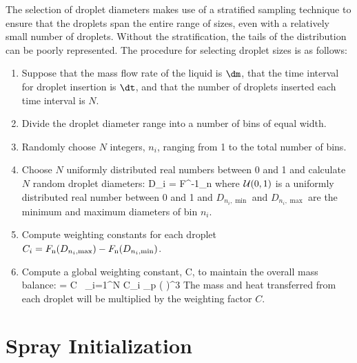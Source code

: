 The selection of droplet diameters makes use of a stratified sampling technique to ensure that the droplets span the entire range of sizes, even with a relatively small number of droplets. Without the stratification, the tails of the distribution can be poorly represented. The procedure for selecting droplet sizes is as follows:
\begin{enumerate}
\item Suppose that the mass flow rate of the liquid is $\dm$, that the time interval for droplet insertion is $\dt$, and that the number of droplets inserted each time interval is $N$.
\item Divide the droplet diameter range into a number of bins of equal width.
\item Randomly choose $N$ integers, $n_i$, ranging from 1 to the total number of bins.
\item Choose $N$ uniformly distributed real numbers between 0 and 1 and calculate $N$ random droplet diameters:
\be
   D_i = F^{-1}_{\rm n}  \label{Ud_strat}
\ee
where ${\cal U}(0,1)$ is a uniformly distributed real number between 0 and 1 and $D_{n_i,\min}$ and $D_{n_i,\max}$ are the minimum and maximum diameters of bin $n_i$.
\item Compute weighting constants for each droplet $C_i = F_{\rm n}(D_{n_i,\max}) - F_{\rm n}(D_{n_i,\min})$.
\item Compute a global weighting constant, C, to maintain the overall mass balance:
    \be \dm \; \dt = C \, \sum_{i=1}^N \; C_i \;  \pi \rho_{\rm p}
      \left(  \right)^3
    \ee
    The mass and heat transferred from each droplet will be multiplied by the weighting factor $C$.
\end{enumerate}


\section{Spray Initialization}

